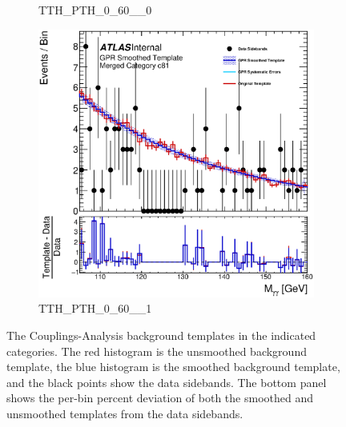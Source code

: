 \begin{figure}
\begin{center}
\begin{subfigure}[T]{0.49\linewidth}
	\caption{TTH\_PTH\_0\_60\_\_0}
\end{subfigure}
\begin{subfigure}[T]{0.49\linewidth}
	\centering
	\includegraphics[width=\linewidth]{figures/background/gpr/coupCatTemplates/GPR_Smoothed_Plot_hmgg_c81.eps}
	\caption{TTH\_PTH\_0\_60\_\_1}
\end{subfigure}
\caption{The Couplings-Analysis background templates in the indicated categories. The red histogram is the unsmoothed background template, the blue histogram is the smoothed background template, and the black points show the data sidebands. The bottom panel shows the per-bin percent deviation of both the smoothed and unsmoothed templates from the data sidebands. }
 \label{fig:gpr_coupcat_20}
 \end{center}
\end{figure}

